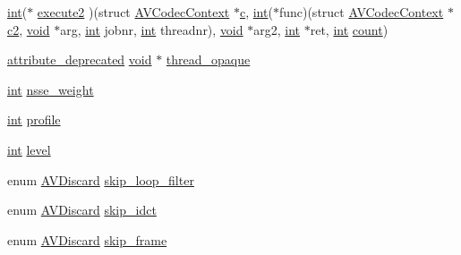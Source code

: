 \begin{DoxyCompactItemize}
\item 
\hyperlink{xmltok_8h_a5a0d4a5641ce434f1d23533f2b2e6653}{int}($\ast$ \hyperlink{struct_a_v_codec_context_acacf593700a5cf7d121196e53bd94ad2}{execute2} )(struct \hyperlink{struct_a_v_codec_context}{A\+V\+Codec\+Context} $\ast$\hyperlink{rfft2d_test_m_l_8m_ae0323a9039add2978bf5b49550572c7c}{c}, \hyperlink{xmltok_8h_a5a0d4a5641ce434f1d23533f2b2e6653}{int}($\ast$func)(struct \hyperlink{struct_a_v_codec_context}{A\+V\+Codec\+Context} $\ast$\hyperlink{convtest_8m_a09ab2f3b6c61c793c7b6d24912b2cea0}{c2}, \hyperlink{sound_8c_ae35f5844602719cf66324f4de2a658b3}{void} $\ast$arg, \hyperlink{xmltok_8h_a5a0d4a5641ce434f1d23533f2b2e6653}{int} jobnr, \hyperlink{xmltok_8h_a5a0d4a5641ce434f1d23533f2b2e6653}{int} threadnr), \hyperlink{sound_8c_ae35f5844602719cf66324f4de2a658b3}{void} $\ast$arg2, \hyperlink{xmltok_8h_a5a0d4a5641ce434f1d23533f2b2e6653}{int} $\ast$ret, \hyperlink{xmltok_8h_a5a0d4a5641ce434f1d23533f2b2e6653}{int} \hyperlink{metrics_8c_afea6e77db19a2f8c91419904fe665a3a}{count})
\item 
\hyperlink{attributes_8h_aa6d076561d3a9eea4729ee632652de02}{attribute\+\_\+deprecated} \hyperlink{sound_8c_ae35f5844602719cf66324f4de2a658b3}{void} $\ast$ \hyperlink{struct_a_v_codec_context_aeed57307d47f36a39905f206eee8dd96}{thread\+\_\+opaque}
\item 
\hyperlink{xmltok_8h_a5a0d4a5641ce434f1d23533f2b2e6653}{int} \hyperlink{struct_a_v_codec_context_a01e1ed5a7828461239d017147a0c5959}{nsse\+\_\+weight}
\item 
\hyperlink{xmltok_8h_a5a0d4a5641ce434f1d23533f2b2e6653}{int} \hyperlink{struct_a_v_codec_context_a7abe7095de73df98df4895bf9e25fc6b}{profile}
\item 
\hyperlink{xmltok_8h_a5a0d4a5641ce434f1d23533f2b2e6653}{int} \hyperlink{struct_a_v_codec_context_a6927dc652ae6241f1dfdbad4e12d3a40}{level}
\item 
enum \hyperlink{group__lavc__decoding_ga352363bce7d3ed82c101b3bc001d1c16}{A\+V\+Discard} \hyperlink{struct_a_v_codec_context_a6be328131743a97103b89e028e62e771}{skip\+\_\+loop\+\_\+filter}
\item 
enum \hyperlink{group__lavc__decoding_ga352363bce7d3ed82c101b3bc001d1c16}{A\+V\+Discard} \hyperlink{struct_a_v_codec_context_ac3d90275bfb1153a5b00ebc2dd32a689}{skip\+\_\+idct}
\item 
enum \hyperlink{group__lavc__decoding_ga352363bce7d3ed82c101b3bc001d1c16}{A\+V\+Discard} \hyperlink{struct_a_v_codec_context_af869b808363998c80adf7df6a944a5a6}{skip\+\_\+frame}
\item 

\end{DoxyCompactItemize}
